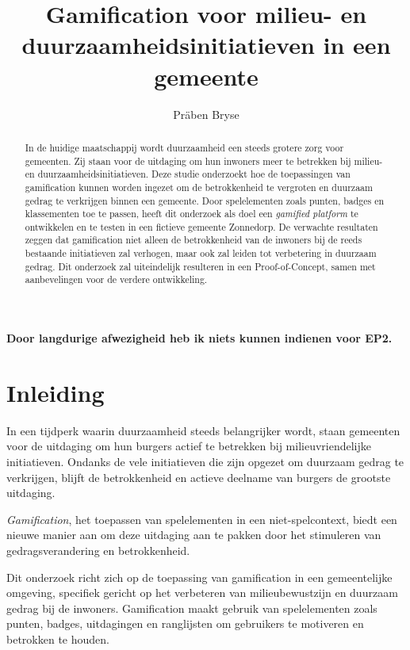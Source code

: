 \documentclass{hogent-article}
\title{Gamification voor milieu- en duurzaamheidsinitiatieven in een gemeente}
\author{Präben Bryse}
\begin{document}
    
\begin{abstract}
    In de huidige maatschappij wordt duurzaamheid een steeds grotere zorg voor gemeenten. Zij staan voor de uitdaging om hun inwoners meer te betrekken bij milieu- en duurzaamheidsinitiatieven. Deze studie onderzoekt hoe de toepassingen van gamification kunnen worden ingezet om de betrokkenheid te vergroten en duurzaam gedrag te verkrijgen binnen een gemeente. Door spelelementen zoals punten, badges en klassementen toe te passen, heeft dit onderzoek als doel een \emph{gamified platform} te ontwikkelen en te testen in een fictieve gemeente Zonnedorp. De verwachte resultaten zeggen dat gamification niet alleen de betrokkenheid van de inwoners bij de reeds bestaande initiatieven zal verhogen, maar ook zal leiden tot verbetering in duurzaam gedrag. Dit onderzoek zal uiteindelijk resulteren in een Proof-of-Concept, samen met aanbevelingen voor de verdere ontwikkeling. 
\end{abstract}

\tableofcontents

\bigskip

%
\paragraph{Door langdurige afwezigheid heb ik niets kunnen indienen voor EP2.}
%

\section{Inleiding}%
\label{sec:inleiding}

In een tijdperk waarin duurzaamheid steeds belangrijker wordt, staan gemeenten voor de uitdaging om hun burgers actief te betrekken bij milieuvriendelijke initiatieven. Ondanks de vele initiatieven die zijn opgezet om duurzaam gedrag te verkrijgen, blijft de betrokkenheid en actieve deelname van burgers de grootste uitdaging. 

\emph{Gamification}, het toepassen van spelelementen in een niet-spelcontext, biedt een nieuwe manier aan om deze uitdaging aan te pakken door het stimuleren van gedragsverandering en betrokkenheid.

Dit onderzoek richt zich op de toepassing van gamification in een gemeentelijke omgeving, specifiek gericht op het verbeteren van milieubewustzijn en duurzaam gedrag bij de inwoners. Gamification maakt gebruik van spelelementen zoals punten, badges, uitdagingen en ranglijsten om gebruikers te motiveren en betrokken te houden.
\end{document}
